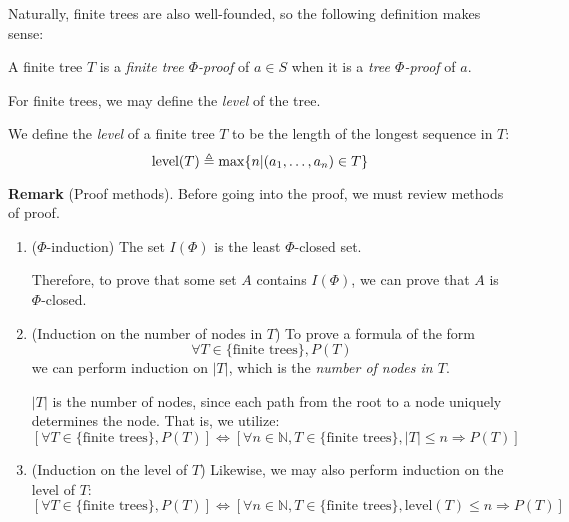 \documentclass[12pt]{article}
\begin{document}
Naturally, finite trees are also well-founded, so the following definition makes sense:
\begin{definition}
	A finite tree $T$ is a \emph{finite tree $\Phi$-proof} of $a\in S$ when it is a \emph{tree $\Phi$-proof} of $a$.
\end{definition}

For finite trees, we may define the \emph{level} of the tree.
\begin{definition}
	We define the \emph{level} of a finite tree $T$ to be the length of the longest sequence in $T$:
	\[\text{level}(T)\triangleq\max\{n|(a_1,\dots,a_n)\in T\}\]
\end{definition}

\noindent\textbf{Remark }(Proof methods).
Before going into the proof, we must review methods of proof.
\begin{enumerate}
	\item($\Phi$-induction)
	      The set $I(\Phi)$ is the least $\Phi$-closed set.

	      Therefore, to prove that some set $A$ contains $I(\Phi)$, we can prove that $A$ is $\Phi$-closed.
	\item(Induction on the number of nodes in $T$)
	      To prove a formula of the form
	      \[\forall T\in\{\text{finite trees}\}, P(T)\]
	      we can perform induction on $|T|$, which is the \emph{number of nodes in $T$}.

	      $|T|$ is the number of nodes, since each path from the root to a node uniquely determines the node.
	      That is, we utilize:
	      \[
		      [\forall T\in\{\text{finite trees}\},P(T)]
		      \Leftrightarrow
		      [\forall n\in\mathbb{N},T\in\{\text{finite trees}\},|T|\le n\Rightarrow P(T)]
	      \]
	\item(Induction on the level of $T$)
	      Likewise, we may also perform induction on the level of $T$:
	      \[
		      [\forall T\in\{\text{finite trees}\},P(T)]
		      \Leftrightarrow
		      [\forall n\in\mathbb{N},T\in\{\text{finite trees}\},\text{level}(T)\le n\Rightarrow P(T)]
	      \]
\end{enumerate}
\end{document}
